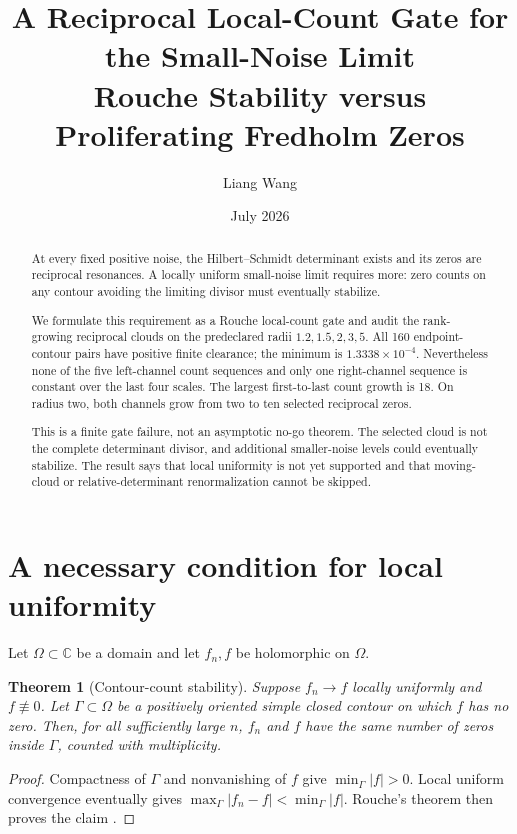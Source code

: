 \documentclass[11pt]{article}
\title{A Reciprocal Local-Count Gate for the Small-Noise Limit\\
\large Rouche Stability versus Proliferating Fredholm Zeros}
\author{Liang Wang}
\date{July 2026}
\newtheorem{theorem}{Theorem}[section]
\theoremstyle{remark}\newtheorem{remark}[theorem]{Remark}
\begin{document}
\maketitle

\begin{abstract}
At every fixed positive noise, the Hilbert--Schmidt determinant exists and its
zeros are reciprocal resonances. A locally uniform small-noise limit requires
more: zero counts on any contour avoiding the limiting divisor must eventually
stabilize.

We formulate this requirement as a Rouche local-count gate and audit the
rank-growing reciprocal clouds on the predeclared radii
$1.2,1.5,2,3,5$. All 160 endpoint-contour pairs have positive finite
clearance; the minimum is $1.3338\times10^{-4}$. Nevertheless none of the
five left-channel count sequences and only one right-channel sequence is
constant over the last four scales. The largest first-to-last count growth is
18. On radius two, both channels grow from two to ten selected reciprocal
zeros.

This is a finite gate failure, not an asymptotic no-go theorem. The selected
cloud is not the complete determinant divisor, and additional smaller-noise
levels could eventually stabilize. The result says that local uniformity is
not yet supported and that moving-cloud or relative-determinant
renormalization cannot be skipped.
\end{abstract}

\section{A necessary condition for local uniformity}

Let $\Omega\subset\mathbb C$ be a domain and let $f_n,f$ be holomorphic on
$\Omega$.

\begin{theorem}[Contour-count stability]\label{thm:rouche}
Suppose $f_n\to f$ locally uniformly and $f\not\equiv0$. Let
$\Gamma\subset\Omega$ be a positively oriented simple closed contour on which
$f$ has no zero. Then, for all sufficiently large $n$, $f_n$ and $f$ have the
same number of zeros inside $\Gamma$, counted with multiplicity.
\end{theorem}
\begin{proof}
Compactness of $\Gamma$ and nonvanishing of $f$ give
$\min_\Gamma|f|>0$. Local uniform convergence eventually gives
$\max_\Gamma|f_n-f|<\min_\Gamma|f|$. Rouche's theorem then proves the
claim \citep{Conway1978}.
\end{proof}
\end{document}
